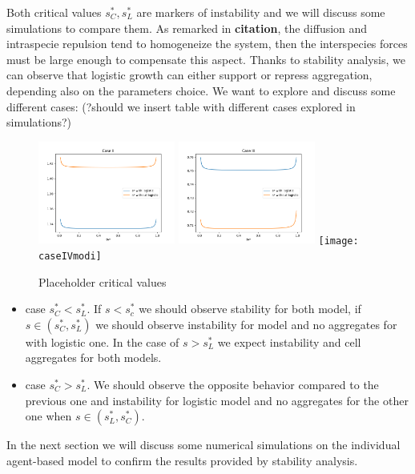\noindent Both critical values $s^{*}_C, s^{*}_L$ are markers of instability and we will discuss some simulations to compare them. As remarked in \textbf{citation}, the diffusion and intraspecie repulsion tend to homogeneize the system, then the interspecies forces must be large enough to compensate this aspect. Thanks to stability analysis, we can observe that logistic growth can either support or repress aggregation, depending also on the parameters choice.
We want to explore and discuss some different cases:
(?should we insert table with different cases explored in simulations?)
\begin{figure}
	\includegraphics[width=4.5cm]{sstar_caseII}
	\includegraphics[width=4.5cm]{sstar_caseIII}
	\texttt{[image: caseIVmodi]}
	\caption{Placeholder critical values}
\end{figure}


\begin{itemize}
	\item case $s^{*}_{C}<s^*_{L}$. If $s< s^{*}_{c}$ we should observe stability for both model, if $s \in (s^{*}_C, s^{*}_L)$ we should observe instability for model and no aggregates for with logistic one. In the case of $s>s^{*}_{L}$ we expect instability and cell aggregates for both models. 
	\item case $s^{*}_{C}>s^*_{L}$. We should observe the opposite behavior compared to the previous one and instability for logistic model and no aggregates for the other one when  $s \in (s^{*}_L, s^{*}_C)$.
\end{itemize}


In the next section we will discuss some numerical simulations on the individual agent-based model to confirm the results provided by stability analysis.




